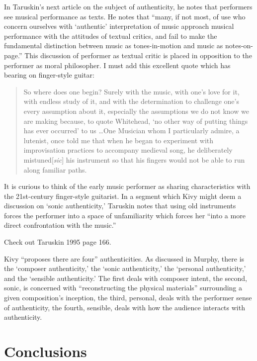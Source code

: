 \documentclass[12pt]{article}
\begin{document}
In Taruskin's next article on the subject of authenticity, he notes
that performers see musical performance as texts. He notes that
``many, if not most, of use who concern ourselves with `authentic'
interpretation of music approach musical performance with the
attitudes of textual critics, and fail to make the fundamental
distinction between music as tones-in-motion and music as
notes-on-page.''\autocite[4]{taruskin1984} This discussion of
performer as textual critic is placed in opposition to the performer
as moral philosopher. I must add this excellent quote which has bearing on finger-style guitar:
\begin{quote}
  So where does one begin? Surely with the music, with one's love for
  it, with endless study of it, and with the determination to
  challenge one's every assumption about it, especially the
  assumptions we do not know we are making because, to quote
  Whitehead, `no other way of putting things has ever occurred' to us
  \ldots One Musician whom I particularly admire, a lutenist, once
  told me that when he began to experiment with improvisation
  practices to accompany medieval song, he deliberately
  mistuned[\emph{sic}] his instrument so that his fingers would not be
  able to run along familiar paths.\autocite[10]{taruskin1984}
\end{quote}
It is curious to think of the early music performer as sharing
characteristics with the 21st-century finger-style guitarist. In a
segment which Kivy might deem a discussion on `sonic authenticity,'
Taruskin notes that using old instruments forces the performer into a
space of unfamiliarity which forces her ``into a more direct confrontation with the music.''\autocite[11]{taruskin1984}

Check out Taruskin
1995 page 166.\autocite[166]{taruskin1995}

Kivy ``proposes there are four'' authenticities.\autocite{kivy1995} As
discussed in Murphy, there is the `composer authenticity,' the `sonic
authenticity,' the `personal authenticity,' and the `sensible
authenticity.'\autocite[26]{murphy2008} The first deals with composer
intent, the second, sonic, is concerned with ``reconstructing the
physical materials'' surrounding a given composition's inception, the
third, personal, deals with the performer sense of authenticity, the
fourth, sensible, deals with how the audience interacts with
authenticity.

\section{Conclusions}
\label{sec:conclusions}
\end{document}
